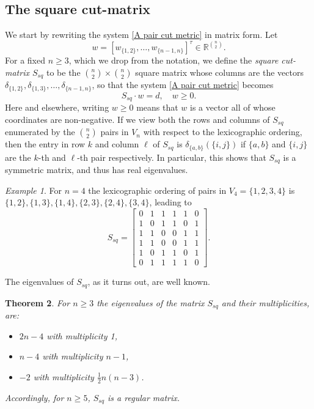 \documentclass[12pt]{amsart}
\newtheorem{theorem}{Theorem}
\numberwithin{theorem}{section}
\theoremstyle{remark}
\newtheorem{example}[theorem]{Example}
\begin{document}
\subsection{The square cut-matrix}
\noindent We start by rewriting the system \eqref{A pair cut metric} in matrix form. Let 
$$w = [w_{\{1,2\}}, \dots, w_{\{n-1,n\}}]^\tau \in \mathbb R^{n\choose 2}.$$
For a fixed $n\ge 3$, which we drop from the notation, we define the  {\em square cut-matrix $S_{sq}$} to be the ${n \choose 2}\times {n \choose 2}$ square matrix whose columns are the vectors $\delta_{\{1,2\}}, \delta_{\{1,3\}},\dots, \delta_{\{n-1,n\}}$, so that the system \eqref{A pair cut metric} becomes 
\begin{equation} \label{A pair cut metric via matrices}   
S_{sq}\cdot w = d, \quad w\ge 0.
\end{equation} 
Here and elsewhere, writing $w\ge 0$ means that $w$ is a vector all of whose coordinates are non-negative. If we view both the rows and columns of $S_{sq}$ enumerated by the ${n \choose 2}$ pairs in $V_n$ with respect to the lexicographic ordering, then the entry in row $k$ and column $\ell$ of $S_{sq}$ is $\delta_{\{a,b\}}(\{i,j\})$ if $\{a,b\}$ and $\{i,j\}$ are the $k$-th and $\ell$-th pair respectively. In particular, this shows that $S_{sq}$ is a symmetric matrix, and thus has real eigenvalues. 
\begin{example} For $n=4$ the lexicographic ordering of pairs in $V_4=\{1,2,3,4\}$ is $\{1,2\}, \{1,3\}, \{1,4\}, \{2,3\}, \{2,4\}, \{3,4\}$, leading to 
$$S_{sq} = \begin{bmatrix} 0 & 1 & 1 & 1 & 1 & 0  \\ 
1 & 0 & 1 & 1 & 0 & 1 \\
1 & 1 & 0 & 0 & 1 & 1 \\
1 & 1 & 0 & 0 & 1 & 1 \\
1 & 0 & 1 & 1 & 0 & 1 \\
0 & 1 & 1 & 1 & 1 & 0 
\end{bmatrix}.  
$$
\end{example} 
\noindent The eigenvalues of $S_{sq}$, as it turns out, are well known. 
\begin{theorem} \label{Full rank of the cut matrix}
For $n\ge 3$ the eigenvalues of the matrix $S_{sq}$ and their multiplicities, are:  
\begin{itemize}
\item[(i)] $2n-4$ with multiplicity 1, 
\item[(ii)] $n-4$ with multiplicity $n-1$,
\item[(iii)] $-2$ with multiplicity $\frac{1}{2}n(n-3)$. 
\end{itemize}
Accordingly, for $n\ge 5$, $S_{sq}$ is a regular matrix. 
\end{theorem}
\end{document}
